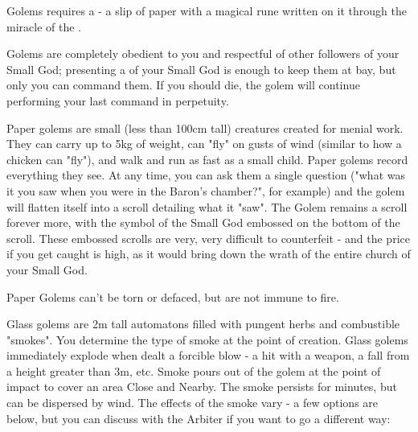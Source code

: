 Golems requires a  - a slip of paper with a magical rune written on it through the miracle of the .

Golems are completely obedient to you and respectful of other followers of your Small God; presenting a  of your Small God is enough to keep them at bay, but only you can command them. If you should die, the golem will continue performing your last command in perpetuity.



Paper golems are small (less than 100cm tall) creatures created for menial work.  They can carry up to 5kg of weight, can "fly" on gusts of wind (similar to how a chicken can "fly"), and walk and run as fast as a small child.  Paper golems record everything they see.  At any time, you can ask them a single question ("what was it you saw when you were in the Baron's chamber?", for example) and the golem will flatten itself into a scroll detailing what it "saw". The Golem remains a scroll forever more, with the symbol of the Small God embossed on the bottom of the scroll.  These embossed scrolls are very, very difficult to counterfeit - and the price if you get caught is high, as it would bring down the wrath of the entire church of your Small God.

Paper Golems can't be torn or defaced, but are not immune to fire.


Glass golems are 2m tall automatons filled with pungent herbs and combustible "smokes".  You determine the type of smoke at the point of creation. Glass golems immediately explode when dealt a forcible blow - a hit with a weapon, a fall from a height greater than 3m, etc. Smoke pours out of the golem at the point of impact to cover an area Close and Nearby. The smoke persists for minutes, but can be dispersed by wind. The effects of the smoke vary - a few options are below, but you can discuss with the Arbiter if you want to go a different way:

